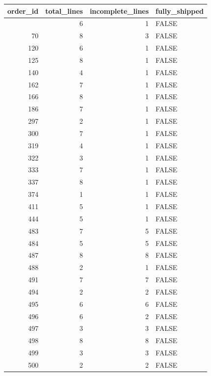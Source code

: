 \documentclass[
]{article}
\newcounter{none} %
\begin{document}
{\def\LTcaptype{none} %
\begin{longtable}[]{@{}rrrl@{}}
\toprule\noalign{}
order\_id & total\_lines & incomplete\_lines & fully\_shipped \\
\midrule\noalign{}
\endhead
\bottomrule\noalign{}
\endlastfoot
65 & 6 & 1 & FALSE \\
70 & 8 & 3 & FALSE \\
120 & 6 & 1 & FALSE \\
125 & 8 & 1 & FALSE \\
140 & 4 & 1 & FALSE \\
162 & 7 & 1 & FALSE \\
166 & 8 & 1 & FALSE \\
186 & 7 & 1 & FALSE \\
297 & 2 & 1 & FALSE \\
300 & 7 & 1 & FALSE \\
319 & 4 & 1 & FALSE \\
322 & 3 & 1 & FALSE \\
333 & 7 & 1 & FALSE \\
337 & 8 & 1 & FALSE \\
374 & 1 & 1 & FALSE \\
411 & 5 & 1 & FALSE \\
444 & 5 & 1 & FALSE \\
483 & 7 & 5 & FALSE \\
484 & 5 & 5 & FALSE \\
487 & 8 & 8 & FALSE \\
488 & 2 & 1 & FALSE \\
491 & 7 & 7 & FALSE \\
494 & 2 & 2 & FALSE \\
495 & 6 & 6 & FALSE \\
496 & 6 & 2 & FALSE \\
497 & 3 & 3 & FALSE \\
498 & 8 & 8 & FALSE \\
499 & 3 & 3 & FALSE \\
500 & 2 & 2 & FALSE \\
\end{longtable}
}
\end{document}
